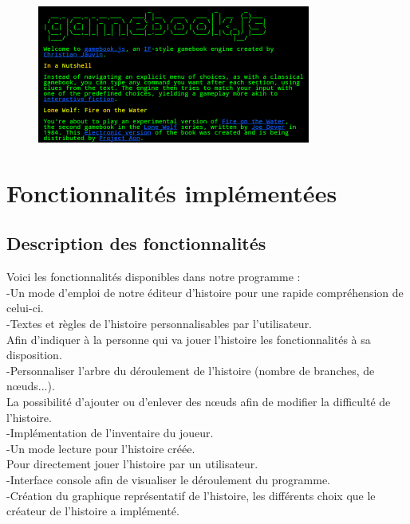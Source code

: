 \documentclass[12pt]{article}
\begin{document}
\begin{figure}[htp]
  
  \centering
    \includegraphics[width=0.8\textwidth]{Exemple}
\end{figure}

\newpage
\section{Fonctionnalités implémentées}
\subsection{Description des fonctionnalités}
\noindent
Voici les fonctionnalités disponibles dans notre programme :\bigskip
\\
-Un mode d'emploi de notre éditeur d'histoire pour une rapide compréhension de celui-ci.
\\
-Textes et règles de l'histoire personnalisables par l'utilisateur.\\
Afin d'indiquer à la personne qui va jouer l'histoire les fonctionnalités à sa disposition.\medskip
\\
-Personnaliser l'arbre du déroulement de l'histoire (nombre de branches, de nœuds...).\\
La possibilité d'ajouter ou d'enlever des nœuds afin de modifier la difficulté de l'histoire.\medskip
\\
-Implémentation de l'inventaire du joueur.\medskip
\\
-Un mode lecture pour l'histoire créée.\\
Pour directement jouer l'histoire par un utilisateur.\medskip
\\
-Interface console afin de visualiser le déroulement du programme.\medskip
\\
-Création du graphique représentatif de l'histoire, les différents choix que le créateur de l'histoire a implémenté.
\end{document}
